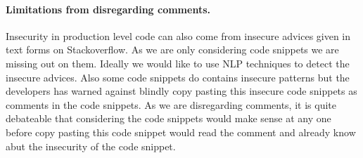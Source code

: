 
\noindent
\paragraph{Limitations from disregarding comments.} Insecurity in production level code can also come from 
insecure advices given in text forms on Stackoverflow. 
As we are only considering code snippets we are missing out on them. 
Ideally we would like to use NLP techniques to detect the insecure advices. Also some code snippets do contains insecure patterns 
but the developers has warned against blindly copy pasting this insecure code snippets as comments in the code snippets. As we are disregarding
comments, it is quite debateable that considering the code snippets would make sense at any one before copy pasting this
code snippet would read the comment and already know abut the insecurity of the code snippet.     